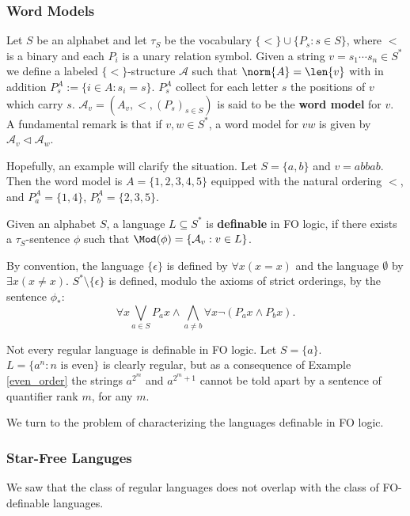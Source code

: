 \subsubsection{Word Models}
Let $S$ be an alphabet and let $\tau_S$ be the vocabulary $\{<\} \cup \{P_s : s \in S\}$, where $<$ is a binary and each $P_i$ is a unary relation symbol. 
Given a string $v=s_{1} \cdots s_{n} \in S^{\ast}$ we define a labeled $\{<\}$-structure $\mathcal{A}$ such that $\norm{A}=\len{v}$ with in addition $P^A _s:=\{i \in A : s_i=s\}$. 
$P^A _s$ collect for each letter $s$ the positions of $v$ which carry $s$. 
$\mathcal{A}_v=(A_v, <, (P_s)_{s\in S})$ is said to be the \textbf{word model} for $v$. 
A fundamental remark is that if $v, w \in S^{\ast}$, a word model for $vw$ is given by $\mathcal{A}_v \triangleleft \mathcal{A}_w$.  

Hopefully, an example will clarify the situation. 
Let $S=\{a,b\}$ and $v=abbab$. Then the word model is $A=\{1,2,3,4,5\}$ equipped with the natural ordering $<$, and $P^A _a=\{1,4\}$, $P^A _b=\{2,3,5\}$.

\begin{defn} Given an alphabet $S$, a language $L \subseteq S^{\ast}$ is \textbf{definable} in FO logic, if there exists a $\tau_S$-sentence $\phi$ such that $\Mod(\phi)=\{\mathcal{A}_v : v \in L\}$.  
\end{defn}

By convention, the language $\{\epsilon\}$ is defined by 
$\forall x (x=x)$ and the language $\emptyset$ by $\exists x (x \neq x)$. $S^{\ast} \setminus \{\epsilon\}$ is defined, modulo the axioms of strict orderings, by the sentence $\phi_{\ast}$:
$$\forall x \bigvee_{a \in S} P_a x \land \bigwedge_{a \neq b} \forall x \lnot(P_a x \land P_b x)\text{.}$$ 

Not every regular language is definable in FO logic. 
Let $S=\{a\}$. 
$L=\{a^n : n \text{ is even}\}$ is clearly regular, but as a consequence of Example \ref{even_order} the strings $a^{2^m}$ and $a^{2^m+1}$ cannot be told apart by a sentence of quantifier rank $m$, for any $m$. 

We turn to the problem of characterizing the languages definable in FO logic.

\subsubsection{Star-Free Languges} 
We saw that the class of regular languages does not overlap with the class of FO-definable languages. 

